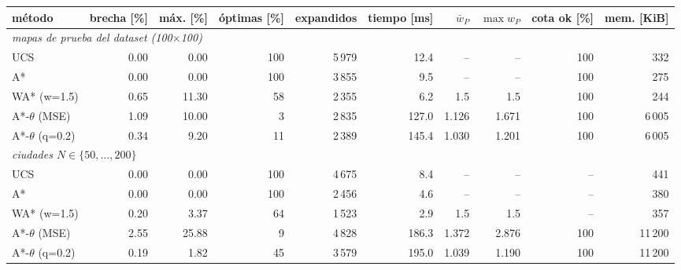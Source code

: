 \begin{tabular}{lrrrrrrrrr}
\toprule
método & brecha [\%] & máx. [\%] & óptimas [\%] & expandidos & tiempo [ms] & $\bar w_P$ & $\max w_P$ & cota ok [\%] & mem. [KiB] \\
\midrule
\multicolumn{10}{l}{\emph{mapas de prueba del dataset (100$\times$100)}} \\
UCS & 0.00 & 0.00 & 100 & 5\,979 & 12.4 & -- & -- & 100 & 332 \\
A* & 0.00 & 0.00 & 100 & 3\,855 & 9.5 & -- & -- & 100 & 275 \\
WA* (w=1.5) & 0.65 & 11.30 & 58 & 2\,355 & 6.2 & 1.5 & 1.5 & 100 & 244 \\
A*-$\theta$ (MSE) & 1.09 & 10.00 & 3 & 2\,835 & 127.0 & 1.126 & 1.671 & 100 & 6\,005 \\
A*-$\theta$ (q=0.2) & 0.34 & 9.20 & 11 & 2\,389 & 145.4 & 1.030 & 1.201 & 100 & 6\,005 \\
\midrule
\multicolumn{10}{l}{\emph{ciudades $N\in\{50,\dots,200\}$}} \\
UCS & 0.00 & 0.00 & 100 & 4\,675 & 8.4 & -- & -- & -- & 441 \\
A* & 0.00 & 0.00 & 100 & 2\,456 & 4.6 & -- & -- & -- & 380 \\
WA* (w=1.5) & 0.20 & 3.37 & 64 & 1\,523 & 2.9 & 1.5 & 1.5 & -- & 357 \\
A*-$\theta$ (MSE) & 2.55 & 25.88 & 9 & 4\,828 & 186.3 & 1.372 & 2.876 & 100 & 11\,200 \\
A*-$\theta$ (q=0.2) & 0.19 & 1.82 & 45 & 3\,579 & 195.0 & 1.039 & 1.190 & 100 & 11\,200 \\
\bottomrule
\end{tabular}
